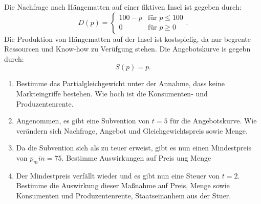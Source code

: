 \begin{question}
	Die Nachfrage nach Hängematten auf einer fiktiven Insel ist gegeben durch:
	\[
		D(p) = \begin{cases}
			100-p & \text{für } p \le 100 \\
			0     & \text{für } p \ge 0
		\end{cases}
		.\]
	Die Produktion von Hängematten auf der Insel ist kostspielig, da nur begrente Ressourcen und Know-how zu Verüfgung stehen.
	Die Angebotskurve is gegebn durch:
	\[
		S(p) = p
		.\]
	\begin{enumerate}
		\item Bestimme das Partialgleichgewicht unter der Annahme,
		      dass keine Markteingriffe bestehen. Wie hoch ist die Konsumenten- und Produzentenrente.
		\item Angenommen, es gibt eine Subvention von $t=5$ für die Angebotskurve. Wie verändern sich Nachfrage, Angebot und Gleichgewichtspreis sowie Menge.
		\item Da die Subvention sich als zu teuer erweist, gibt es nun einen Mindestpreis von $p_min = 75$. Bestimme Auswirkungen auf Preis ung Menge
		\item Der Mindestpreis verfällt wieder und es gibt nun eine Steuer von $t=2$. Bestimme die Auswirkung dieser Maßnahme auf Preis, Menge sowie Konsumenten und Produzentenrente, Staatseinanhem aus der Stuer.
	\end{enumerate}
\end{question}
